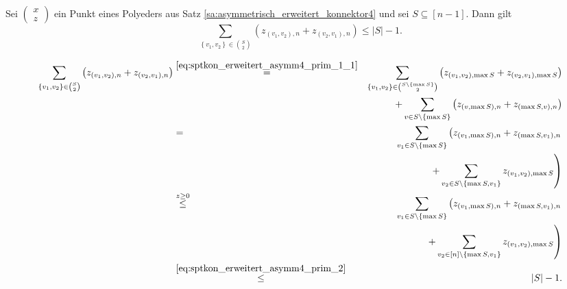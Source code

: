 \documentclass[10p,a4paper,BCOR = 12mm, DIV=15]{scrbook}
\begin{document}
\begin{Prop}
\label{prop:asymmetrisch_erweitert_konnektor4}
Sei $\left(
\begin{array}{c}
x \\
z
\end{array}
\right)$ ein Punkt eines Polyeders aus Satz \ref{sa:asymmetrisch_erweitert_konnektor4} und sei $S \subseteq \left[n-1\right]$. Dann gilt
\begin{displaymath}
\sum_{\left\{v_1, v_2\right\} \in {S \choose 2}} \left(z_{\left(v_1, v_2\right), n} + z_{\left(v_2, v_1\right), n}\right) \leq \left|S\right| - 1.
\end{displaymath}
\end{Prop}
\begin{bew}
\begin{eqnarray*}
\sum_{\left\{v_1, v_2\right\} \in {S \choose 2}} \left(z_{\left(v_1, v_2\right), n} + z_{\left(v_2, v_1\right), n}\right) & \stackrel{\eqref{eq:sptkon_erweitert_asymm4_prim_1_1}}{=} & \sum_{\left\{v_1, v_2\right\} \in {S \backslash \left\{\max S\right\} \choose 2}} \left(z_{\left(v_1, v_2\right), \max S} + z_{\left(v_2, v_1\right), \max S}\right) \\
& & + \sum_{v \in S \backslash \left\{\max S\right\}} \left(z_{\left(v, \max S\right), n} + z_{\left(\max S, v\right), n}\right) \\
& = & \sum_{v_1 \in S \backslash \left\{\max S\right\}} \left(z_{\left(v_1, \max S\right), n} + z_{\left(\max S, v_1\right), n} \right. \\
& & \left. + \sum_{v_2 \in S \backslash \left\{\max S, v_1\right\}} z_{\left(v_1, v_2\right), \max S}\right) \\
& \stackrel{z \geq 0}{\leq} & \sum_{v_1 \in S \backslash \left\{\max S\right\}} \left(z_{\left(v_1, \max S\right), n} + z_{\left(\max S, v_1\right), n} \right. \\
& & \left. + \sum_{v_2 \in \left[n\right] \backslash \left\{\max S, v_1\right\}} z_{\left(v_1, v_2\right), \max S}\right) \\
& \stackrel{\eqref{eq:sptkon_erweitert_asymm4_prim_2}}{\leq} & \left|S\right| - 1.
\end{eqnarray*}
\end{bew}
\end{document}
